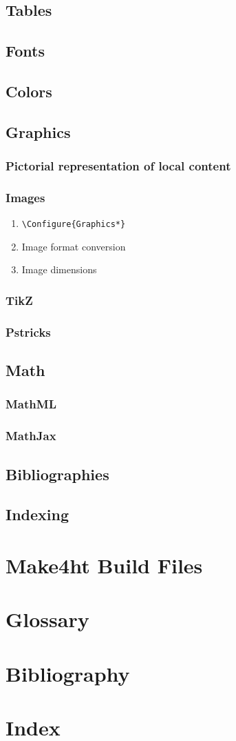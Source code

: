 \documentclass{book}
\begin{document}
\section{Tables}

\section{Fonts}
\section{Colors}

\section{Graphics}
\subsection{Pictorial representation of local content}
\subsection{Images}
\begin{enumerate}
  \item \verb|\Configure{Graphics*}|
  \item Image format conversion
  \item Image dimensions
\end{enumerate}
\subsection{TikZ }
\subsection{Pstricks}

\section{Math}
\subsection{MathML}
\subsection{MathJax}

\section{Bibliographies}
\section{Indexing}

\chapter{Make4ht Build Files}

\chapter{Glossary}
\chapter{Bibliography}
\chapter{Index}
\end{document}
